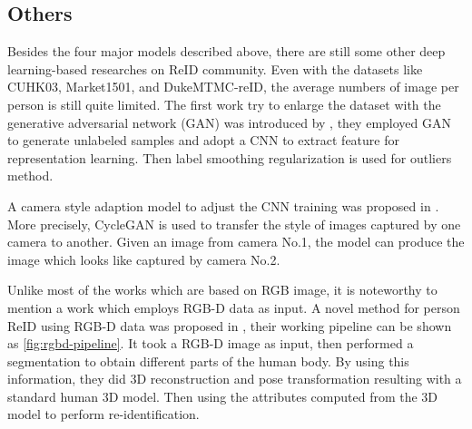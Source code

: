 \subsection{Others}
\label{sec:related_work_other}

Besides the four major models described above, there are still some other deep 
learning-based researches on ReID community.
Even with the datasets like CUHK03, Market1501, and DukeMTMC-reID, the average 
numbers of image per person is still quite limited. The first work try to 
enlarge the dataset with the generative adversarial network (GAN) was 
introduced by \cite{first-gan-for-reid}, they employed GAN to generate 
unlabeled samples and adopt a CNN to extract feature for representation 
learning. Then label smoothing regularization is used for outliers method.

A camera style adaption model to adjust the CNN training was proposed in 
\cite{camera-style-adaptation-for-reid}. 
More precisely, CycleGAN is used to transfer the style of images captured by 
one camera to another. Given an image from camera No.1, the model
can produce the image which looks like captured by camera No.2.

Unlike most of the works which are based on RGB image, it is noteworthy to 
mention a work which employs RGB-D data as input.
A novel method for person ReID using RGB-D data was proposed in 
\cite{rgbd-for-reid}, their working pipeline can be shown as 
\autoref{fig:rgbd-pipeline}.
It took a RGB-D image as input, then performed a segmentation to obtain 
different parts of the human body. By using this information, they
did 3D reconstruction and pose transformation resulting with a standard human 
3D model. Then using the attributes computed from
the 3D model to perform re-identification.

